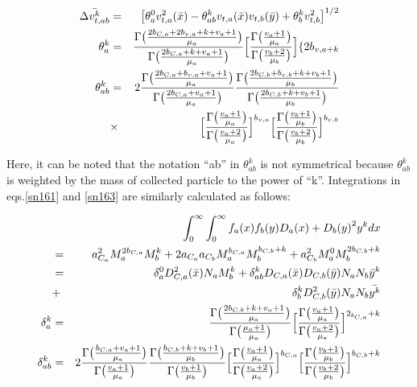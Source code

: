 \begin{eqnarray}
\bar{\Delta v_{t,ab}^{k}}&=&\bigl[\theta_{a}^{0}v_{t,a}^{2}(\bar{x})-\theta_{ab}^{k}v_{t,a}(\bar{x})v_{t,b}(\bar{y})+\theta_{b}^{k}v_{t,b}^{2}\bigr]^{1/2}\label{sn170}\\
\theta_{a}^{k}&=&\frac{\Gamma\bigl(\frac{2b_{C,a}+2b_{v,a}+k+v_{a}+1}{\mu_{a}}\bigr)}{\Gamma\bigl(\frac{2b_{C,a}+k+v_{a}+1}{\mu_{a}}\bigr)}\Bigl[\frac{\Gamma\bigl(\frac{v_{a}+1}{\mu_{a}}\bigr)}{\Gamma\bigl(\frac{v_{b}+2}{\mu_{b}}\bigr)}\Bigr]\{2b_{v,a+k}\label{sn171}\\
\theta_{ab}^{k}&=&2\frac{\Gamma\bigl(\frac{2b_{C,a}+b_{v,a}+v_{a}+1}{\mu_{a}}\bigr)}{\Gamma\bigl(\frac{2b_{C,a}+v_{a}+1}{\mu_{a}}\bigr)}\frac{\Gamma\bigl(\frac{2b_{C,b}+b_{v,b}+k+v_{b}+1}{\mu_{b}}\bigr)}{\Gamma\bigl(\frac{2b_{C,b}+k+v_{b}+1}{\mu_{b}}\bigr)}\nonumber\\
&\times&\Bigl[\frac{\Gamma\bigl(\frac{v_{a}+1}{\mu_{a}}\bigr)}{\Gamma\bigl(\frac{v_{a}+2}{\mu_{a}}\bigr)}\Bigr]^{b_{v,a}}\Bigl[\frac{\Gamma\bigl(\frac{v_{b}+1}{\mu_{b}}\bigr)}{\Gamma\bigl(\frac{v_{b}+2}{\mu_{b}}\bigr)}\Bigr]^{b_{v,b}}\label{sn172}
\end{eqnarray}

Here, it can be noted that the notation “ab” in $\theta_{ab}^{k}$ is not symmetrical because $\theta_{ab}^{k}$ is weighted by the mass of collected particle to the power of “k”. Integrations in eqs.\ref{sn161} and \ref{sn163} are similarly calculated as follows:


\begin{eqnarray}
& &\int_{0}^{\infty}\int_{0}^{\infty}f_{a}(x)f_{b}(y){D_{a}(x)+D_{b}(y)}^{2}y^{k}dx\nonumber\\
&=& a_{C_{a}}^{2}M_{a}^{2b_{C,a}}M_{b}^{k}+2a_{C_{a}}a_{C_{b}}M_{a}^{b_{C,a}}M_{b}^{b_{C,b}+k}+a_{C_{b}}^{2}M_{a}^{0}M_{b}^{2b_{C,b}+k}\nonumber\\
&=& \delta_{a}^{0}D_{C,a}^{2}(\bar{x})N_{a}M_{b}^{k}+\delta_{ab}^{k}D_{C,a}(\bar{x})D_{C,b}(\bar{y})N_{a}N_{b}\bar{y}^{k}\nonumber\\
&+&\delta_{b}^{k}D_{C,b}^{2}(\bar{y})N_{a}N_{b}\bar{y^{k}}\label{sn173}\\
\delta_{a}^{k}&=&\frac{\Gamma\bigl(\frac{2b_{C,b}+k+v_{a}+1}{\mu_{a}}\bigr)}{\Gamma\bigl(\frac{\mu_{a}+1}{\mu_{a}}\bigr)}\Bigl[\frac{\Gamma\bigl(\frac{v_{a}+1}{\mu_{a}}\bigr)}{\Gamma\bigl(\frac{v_{a}+2}{\mu_{a}}\bigr)}\Bigr]^{2_{b_{C,a}}+k}\label{sn174}\\
\delta_{ab}^{k}&=& 2\frac{\Gamma\bigl(\frac{b_{C,a}+v_{a}+1}{\mu_{a}}\bigr)}{\Gamma\bigl(\frac{v_{a}+1}{\mu_{a}}\bigr)}\frac{\Gamma\bigl(\frac{b_{C,b}+k+v_{b}+1}{\mu_{b}}\bigr)}{\Gamma\bigl(\frac{v_{b}+1}{\mu_{b}}\bigr)}\Bigl[\frac{\Gamma\bigl(\frac{v_{a}+1}{\mu_{a}}\bigr)}{\Gamma\bigl(\frac{v_{a}+2}{\mu_{a}}\bigr)}\Bigr]^{b_{C,a}}\Bigl[\frac{\Gamma\bigl(\frac{v_{b}+1}{\mu_{b}}\bigr)}{\Gamma\bigl(\frac{v_{b}+2}{\mu_{b}}\bigr)}\Bigr]^{b_{C,b}+k}\label{sn175}
\end{eqnarray}


